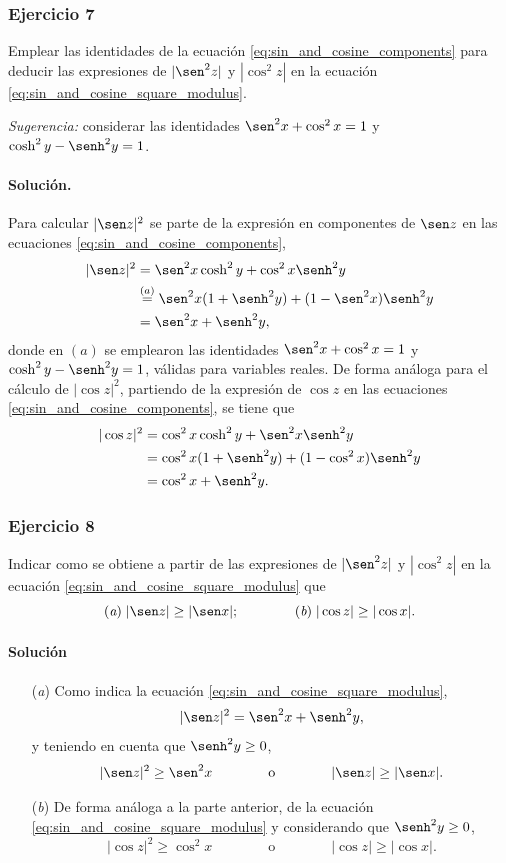 \documentclass[a4paper]{report}
\begin{document}
\subsubsection{Ejercicio 7}

Emplear las identidades de la ecuación \ref{eq:sin_and_cosine_components} para deducir las expresiones de \(|\sen^2z|\) y \(|\cos^2z|\) en la ecuación \ref{eq:sin_and_cosine_square_modulus}.

\emph{Sugerencia:} considerar las identidades \(\sen^2x+\cos^2x=1\) y \(\cosh^2y-\senh^2y=1\).

\paragraph{Solución.} Para calcular \(|\sen z|^2\) se parte de la expresión en componentes de \(\sen z\) en las ecuaciones \ref{eq:sin_and_cosine_components},
\begin{align*}
 |\sen z|^2&=\sen^2x\cosh^2y+\cos^2x\senh^2y\\
  &\overset{(a)}{=}\sen^2x(1+\senh^2y)+(1-\sen^2x)\senh^2y\\
  &=\sen^2x+\senh^2y,
\end{align*}
donde en \((a)\) se emplearon las identidades \(\sen^2x+\cos^2x=1\) y \(\cosh^2y-\senh^2y=1\), válidas para variables reales. De forma análoga para el cálculo de \(|\cos z|^2\), partiendo de la expresión de \(\cos z\) en las ecuaciones \ref{eq:sin_and_cosine_components}, se tiene que 
\begin{align*}
 |\cos z|^2&=\cos^2x\cosh^2y+\sen^2x\senh^2y\\
  &=\cos^2x(1+\senh^2y)+(1-\cos^2x)\senh^2y\\
  &=\cos^2x+\senh^2y.
\end{align*}

\subsubsection{Ejercicio 8}

Indicar como se obtiene a partir de las expresiones de \(|\sen^2z|\) y \(|\cos^2z|\) en la ecuación \ref{eq:sin_and_cosine_square_modulus} que 
\[
 (\textit{a})\;|\sen z|\geq|\sen x|;\qquad\qquad (\textit{b})\;|\cos z|\geq|\cos x|.
\]

\paragraph{Solución}
\begin{enumerate}
 \item[(\textit{a})] Como indica la ecuación \ref{eq:sin_and_cosine_square_modulus},
 \[
  |\sen z|^2=\sen^2x+\senh^2y,
 \]
 y teniendo en cuenta que \(\senh^2y\geq0\),
 \[
  |\sen z|^2\geq\sen^2x
  \qquad\qquad\textrm{o}\qquad\qquad
  |\sen z|\geq|\sen x|.
 \]
 \item[(\textit{b})] De forma análoga a la parte anterior, de la ecuación \ref{eq:sin_and_cosine_square_modulus} y considerando que \(\senh^2y\geq0\),
 \[
  |\cos z|^2\geq\cos^2x
  \qquad\qquad\textrm{o}\qquad\qquad
  |\cos z|\geq|\cos x|.
 \]
\end{enumerate}
\end{document}

